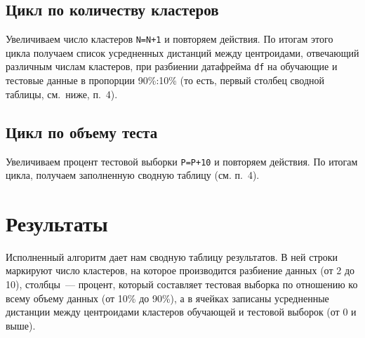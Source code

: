 \documentclass[a4paper,12pt]{article}
\begin{document}
\subsection{Цикл по количеству кластеров}

Увеличиваем число кластеров \texttt{N=N+1} и повторяем действия. По итогам этого цикла получаем список усредненных дистанций между центроидами, отвечающий различным числам кластеров, при разбиении датафрейма \texttt{df} на обучающие и тестовые данные в пропорции 90\%:10\% (то есть, первый столбец сводной таблицы, см. ниже, п. 4).

\subsection{Цикл по объему теста}

Увеличиваем процент тестовой выборки \texttt{P=P+10} и повторяем действия. По итогам цикла, получаем заполненную сводную таблицу (см. п. 4). 

\section{Результаты}

Исполненный алгоритм дает нам сводную таблицу результатов. В ней строки маркируют число кластеров, на которое производится разбиение данных (от 2 до 10), столбцы — процент, который составляет тестовая выборка по отношению ко всему объему данных (от 10\% до 90\%), а в ячейках записаны усредненные  дистанции между центроидами кластеров обучающей и тестовой выборок (от 0 и выше).
\end{document}
